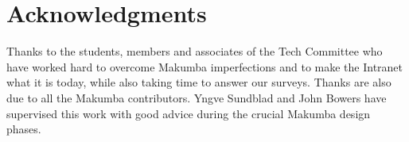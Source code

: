 \documentclass{llncs}
\begin{document}
\section{Acknowledgments}\label{sec:acknowledgments}
Thanks to the students, members and associates of the Tech Committee who have worked hard to overcome Makumba imperfections and to make the Intranet what it is today, while also taking time to answer our surveys.  Thanks are also due to all the Makumba contributors.  Yngve Sundblad and John Bowers have supervised this work with good advice during the crucial Makumba design phases.



 
\end{document}
